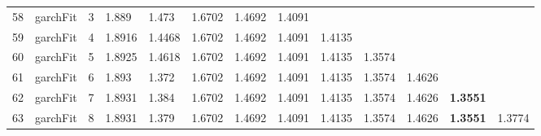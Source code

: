 \documentclass[10pt,a4paper]{article}
\begin{document}
\begin{table}[ht]
\begin{tabular}{rlrllllllllll}
  58 & garchFit &     3 & 1.889 & 1.473 & 1.6702 & 1.4692 & 1.4091 &  &  &  &  &  \\ 
  59 & garchFit &     4 & 1.8916 & 1.4468 & 1.6702 & 1.4692 & 1.4091 & 1.4135 &  &  &  &  \\ 
  60 & garchFit &     5 & 1.8925 & 1.4618 & 1.6702 & 1.4692 & 1.4091 & 1.4135 & 1.3574 &  &  &  \\ 
  61 & garchFit &     6 & 1.893 & 1.372 & 1.6702 & 1.4692 & 1.4091 & 1.4135 & 1.3574 & 1.4626 &  &  \\ 
  62 & garchFit &     7 & 1.8931 & 1.384 & 1.6702 & 1.4692 & 1.4091 & 1.4135 & 1.3574 & 1.4626 & \textbf{1.3551} &  \\ 
  63 & garchFit &     8 & 1.8931 & 1.379 & 1.6702 & 1.4692 & 1.4091 & 1.4135 & 1.3574 & 1.4626 & \textbf{1.3551} & 1.3774 \\ 
   \hline
\end{tabular}
\end{table}
\end{document}
